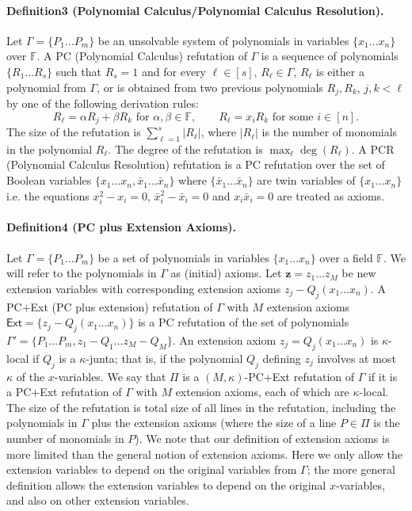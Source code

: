 \documentclass[10pt,a4paper]{article}
\begin{document}
\paragraph{Definition3 (Polynomial Calculus/Polynomial Calculus Resolution).}
Let $\Gamma=\{P_1\ldots P_m\}$ be an unsolvable system of polynomials in variables $\{x_1\ldots x_n\}$ over $\mathbb F$. A PC (Polynomial Calculus) refutation of $\Gamma$ is a sequence of polynomials $\{R_1\ldots R_s\}$ such that $R_s=1$ and for every $\ell\in[s]$, $R_{\ell}\in\Gamma$, $R_{\ell}$ is either a polynomial from $\Gamma$, or is obtained from two previous polynomials $R_j,R_k$, $j,k<\ell$ by one of the following derivation rules:
\[R_{\ell}=\alpha R_j+\beta R_k\text{ for }\alpha,\beta\in\mathbb F,\qquad R_{\ell}=x_iR_k\text{ for some }i\in[n].\]
The size of the refutation is $\sum_{\ell=1}^s|R_{\ell}|$, where $|R_{\ell}|$ is the number of monomials in the polynomial $R_{\ell}$. The degree of the refutation is $\max_{\ell}\deg(R_{\ell})$.
A PCR (Polynomial Calculus Resolution) refutation is a PC refutation over the set of Boolean variables $\{x_1\ldots x_n,\bar x_1\ldots\bar x_n\}$ where $\{\bar x_1\ldots\bar x_n\}$ are twin variables of $\{x_1\ldots x_n\}$ i.e. the equations $x_i^2-x_i=0$, $\bar x_i^2-\bar x_i=0$ and $x_i\bar x_i=0$ are treated as axioms.
\paragraph{Definition4 (PC plus Extension Axioms).}
Let $\Gamma=\{P_1\ldots P_m\}$ be a set of polynomials in variables $\{x_1\ldots x_n\}$ over a field $\mathbb F$. We will refer to the polynomials in $\Gamma$ as (initial) axioms. Let $\mathbf z=z_1\ldots z_M$ be new extension variables with corresponding extension axioms $z_j-Q_j(x_1\ldots x_n)$. A PC+Ext (PC plus extension) refutation of $\Gamma$ with $M$ extension axioms $\mathsf{Ext}=\{z_j-Q_j(x_1\ldots x_n)\}$ is a PC refutation of the set of polynomials $\Gamma'=\{P_1\ldots P_m,z_1-Q_1\ldots z_M-Q_M\}$. An extension axiom $z_j=Q_j(x_1\ldots x_n)$ is $\kappa$-local if $Q_j$ is a $\kappa$-junta; that is, if the polynomial $Q_j$ defining $z_j$ involves at most $\kappa$ of the $x$-variables. We say that $\Pi$ is a $(M,\kappa)$-PC+Ext refutation of $\Gamma$ if it is a PC+Ext refutation of $\Gamma$ with $M$ extension axioms, each of which are $\kappa$-local. The size of the refutation is total size of all lines in the refutation, including the polynomials in $\Gamma$ plus the extension axioms (where the size of a line $P\in\Pi$ is the number of monomials in $P$).
We note that our definition of extension axioms is more limited than the general notion of extension axioms. Here we only allow the extension variables to depend on the original variables from $\Gamma$; the more general definition allows the extension variables to depend on the original $x$-variables, and also on other extension variables.
\end{document}
